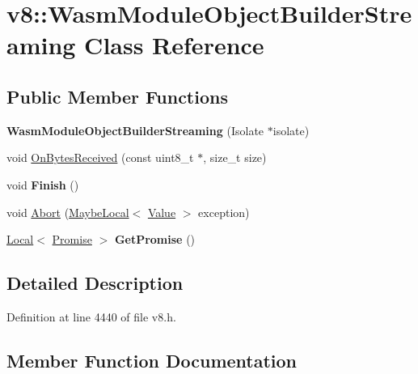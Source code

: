 \hypertarget{classv8_1_1WasmModuleObjectBuilderStreaming}{}\section{v8\+:\+:Wasm\+Module\+Object\+Builder\+Streaming Class Reference}
\label{classv8_1_1WasmModuleObjectBuilderStreaming}
\subsection*{Public Member Functions}
\begin{DoxyCompactItemize}
\item 
\mbox{\label{classv8_1_1WasmModuleObjectBuilderStreaming_a38ecb92cde61095525a4b2728ba091aa}} 
{\bfseries Wasm\+Module\+Object\+Builder\+Streaming} (Isolate $\ast$isolate)
\item 
void \mbox{\hyperlink{classv8_1_1WasmModuleObjectBuilderStreaming_ac67b675b7241a18a3b773dab2f0fd458}{On\+Bytes\+Received}} (const uint8\+\_\+t $\ast$, size\+\_\+t size)
\item 
\mbox{\label{classv8_1_1WasmModuleObjectBuilderStreaming_a679a8781a81a4c926e82924d1a2f2446}} 
void {\bfseries Finish} ()
\item 
void \mbox{\hyperlink{classv8_1_1WasmModuleObjectBuilderStreaming_ac8a2a6e122799d746ded69f80a295fb5}{Abort}} (\mbox{\hyperlink{classv8_1_1MaybeLocal}{Maybe\+Local}}$<$ \mbox{\hyperlink{classv8_1_1Value}{Value}} $>$ exception)
\item 
\mbox{\label{classv8_1_1WasmModuleObjectBuilderStreaming_a1b5def1cfb9746d6e196a5a44ffe6308}} 
\mbox{\hyperlink{classv8_1_1Local}{Local}}$<$ \mbox{\hyperlink{classv8_1_1Promise}{Promise}} $>$ {\bfseries Get\+Promise} ()
\end{DoxyCompactItemize}


\subsection{Detailed Description}


Definition at line 4440 of file v8.\+h.



\subsection{Member Function Documentation}
\mbox{\label{classv8_1_1WasmModuleObjectBuilderStreaming_ac8a2a6e122799d746ded69f80a295fb5}} 
